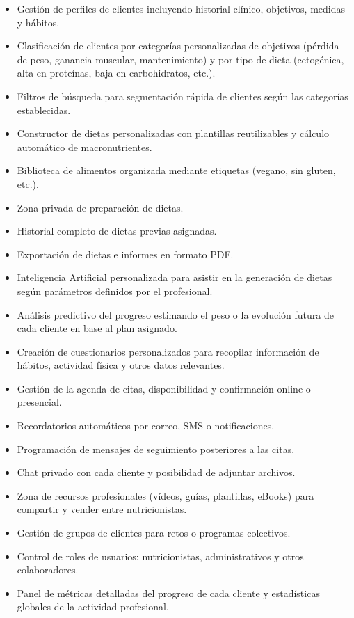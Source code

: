\begin{itemize}
  \item Gestión de perfiles de clientes incluyendo historial clínico, objetivos, medidas y hábitos.
  \item Clasificación de clientes por categorías personalizadas de objetivos (pérdida de peso, ganancia muscular, mantenimiento) y por tipo de dieta (cetogénica, alta en proteínas, baja en carbohidratos, etc.).
  \item Filtros de búsqueda para segmentación rápida de clientes según las categorías establecidas.
  \item Constructor de dietas personalizadas con plantillas reutilizables y cálculo automático de macronutrientes.
  \item Biblioteca de alimentos organizada mediante etiquetas (vegano, sin gluten, etc.).
  \item Zona privada de preparación de dietas.
  \item Historial completo de dietas previas asignadas.
  \item Exportación de dietas e informes en formato PDF.
  \item Inteligencia Artificial personalizada para asistir en la generación de dietas según parámetros definidos por el profesional.
  \item Análisis predictivo del progreso estimando el peso o la evolución futura de cada cliente en base al plan asignado.
  \item Creación de cuestionarios personalizados para recopilar información de hábitos, actividad física y otros datos relevantes.
  \item Gestión de la agenda de citas, disponibilidad y confirmación online o presencial.
  \item Recordatorios automáticos por correo, SMS o notificaciones.
  \item Programación de mensajes de seguimiento posteriores a las citas.
  \item Chat privado con cada cliente y posibilidad de adjuntar archivos.
  \item Zona de recursos profesionales (vídeos, guías, plantillas, eBooks) para compartir y vender entre nutricionistas.
  \item Gestión de grupos de clientes para retos o programas colectivos.
  \item Control de roles de usuarios: nutricionistas, administrativos y otros colaboradores.
  \item Panel de métricas detalladas del progreso de cada cliente y estadísticas globales de la actividad profesional.
\end{itemize}

